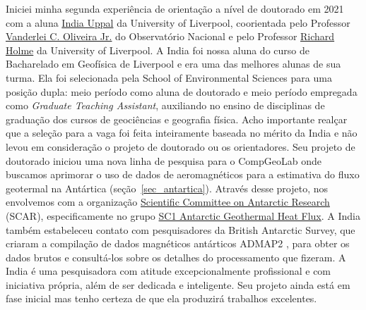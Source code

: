 \documentclass[12pt,a4paper,oneside]{book}
\newcommand{\UoL}{University of Liverpool}
\newcommand{\ON}{Observatório Nacional}
\newcommand{\IndiaLink}{\href{https://www.compgeolab.org/team/\#indiauppal}{India Uppal}}
\begin{document}
Iniciei minha segunda experiência de orientação a nível de doutorado em 2021
com a aluna \IndiaLink{} da \UoL{}, coorientada pelo Professor
\href{https://www.pinga-lab.org/people/oliveira-jr.html}{Vanderlei C. Oliveira Jr.}
do \ON{} e pelo Professor
\href{https://www.liverpool.ac.uk/~holme/}{Richard Holme} da University of
Liverpool.
A India foi nossa aluna do curso de Bacharelado em Geofísica de Liverpool e era
uma das melhores alunas de sua turma.
Ela foi selecionada pela School of Environmental Sciences para uma posição
dupla: meio período como aluna de doutorado e meio período empregada como
\textit{Graduate Teaching Assistant}, auxiliando no ensino de disciplinas de
graduação dos cursos de geociências e geografia física.
Acho importante realçar que a seleção para a vaga foi feita inteiramente
baseada no mérito da India e não levou em consideração o projeto de doutorado
ou os orientadores.
Seu projeto de doutorado iniciou uma nova linha de pesquisa para o CompGeoLab
onde buscamos aprimorar o uso de dados de aeromagnéticos para a estimativa do
fluxo geotermal na Antártica (seção~\ref{sec_antartica}).
Através desse projeto, nos envolvemos com a organização
\href{https://www.scar.org/}{Scientific Committee on Antarctic Research}
(SCAR), especificamente no grupo
\href{https://www.scar-instant.org/index.php/research-themes/theme-2-solid-earth-ice-interactions/sc1-antarctic-geothermal-heat-flux}{SC1
Antarctic Geothermal Heat Flux}.
A India também estabeleceu contato com pesquisadores da British Antarctic
Survey, que criaram a compilação de dados magnéticos antárticos ADMAP2
\citep{Golynsky2018}, para obter os dados brutos e consultá-los sobre os
detalhes do processamento que fizeram.
A India é uma pesquisadora com atitude excepcionalmente profissional e
com iniciativa própria, além de ser dedicada e inteligente.
Seu projeto ainda está em fase inicial mas tenho certeza de que ela produzirá
trabalhos excelentes.
\end{document}
